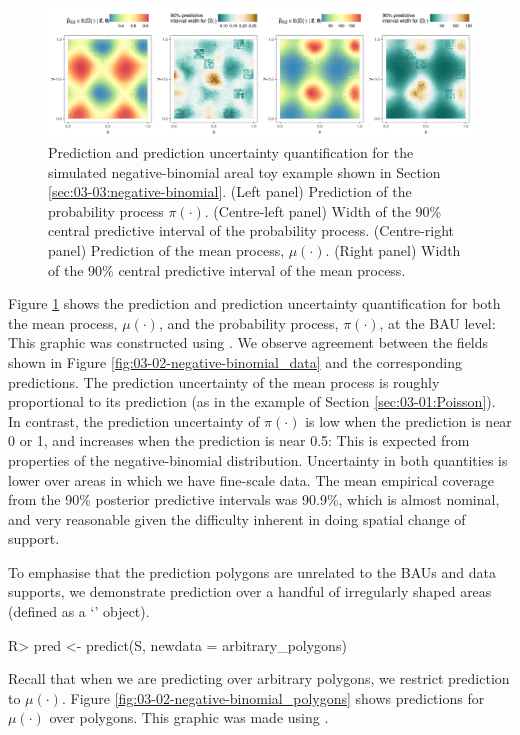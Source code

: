 \documentclass[nojss]{jss}
\newcommand{\class}[1]{`\code{#1}'}
\newcommand{\fct}[1]{\code{#1()}}
\begin{document}
\begin{figure}[t!]
    \centering
    \includegraphics[width = \linewidth]{img/Negbinom_sim_BAU_predictions.png}
    \caption{Prediction and prediction uncertainty quantification for the simulated negative-binomial areal toy example shown in Section \ref{sec:03-03:negative-binomial}. (Left panel) Prediction of the probability process $\pi(\cdot)$. (Centre-left panel) Width of the 90\% central predictive interval of the probability process. (Centre-right panel) Prediction of the mean process, $\mu(\cdot)$. (Right panel) Width of the 90\% central predictive interval of the mean process.
}   
  \label{fig:03-02-negative-binomial}
\end{figure}

Figure \ref{fig:03-02-negative-binomial} shows the prediction and prediction uncertainty quantification for both the mean process, $\mu(\cdot)$, and the probability process, $\pi(\cdot)$, at the BAU level: This graphic was constructed using \fct{plot}.
We observe agreement between the fields shown in Figure \ref{fig:03-02-negative-binomial_data} and the corresponding predictions.  
The prediction uncertainty of the mean process is roughly proportional to its prediction (as in the example of Section \ref{sec:03-01:Poisson}). 
In contrast, the prediction uncertainty of $\pi(\cdot)$ is low when the prediction is near 0 or 1, and increases when the prediction is near 0.5: This is expected from properties of the negative-binomial distribution. 
 Uncertainty in both quantities is lower over areas in which we have fine-scale data. 
 The mean empirical coverage from the 90\% posterior predictive intervals was 90.9\%, which is almost nominal, and very reasonable given the difficulty inherent in doing spatial change of support.

To emphasise that the prediction polygons are unrelated to the BAUs and data supports, we demonstrate prediction over a handful of irregularly shaped areas (defined as a \class{SpatialPolygons*} object).  
\begin{Code}
R> pred <- predict(S, newdata = arbitrary_polygons)
\end{Code}
Recall that when we are predicting over arbitrary polygons, we restrict prediction to $\mu(\cdot)$.
Figure \ref{fig:03-02-negative-binomial_polygons} shows predictions 
for $\mu(\cdot)$ over polygons. This graphic was made using \fct{plot}.
\end{document}
